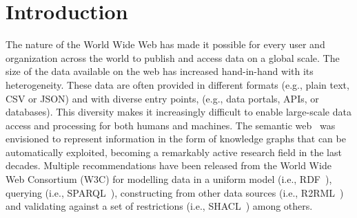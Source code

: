 \chapter{Introduction}
\label{chapter:intro}





The nature of the World Wide Web has made it possible for every user and organization across the world to publish and access data on a global scale. 
The size of the data available on the web has increased hand-in-hand with its heterogeneity. 
These data are often provided in different formats (e.g., plain text, CSV or JSON) and with diverse entry points, (e.g., data portals, APIs, or databases). 
This diversity makes it increasingly difficult to enable large-scale data access and processing for both humans and machines.
The semantic web~\parencite{berners2001semantic} was envisioned to represent information in the form of knowledge graphs that can be automatically exploited, becoming a remarkably active research field in the last decades.
Multiple recommendations have been released from the World Wide Web Consortium (W3C) for modelling data in a uniform model (i.e., RDF~\parencite{rdf}), querying (i.e., SPARQL~\parencite{harris2013sparql}), constructing from other data sources (i.e., R2RML~\parencite{das2012r2rml}) and validating against a set of restrictions (i.e., SHACL~\parencite{SHACL}) among others. 

